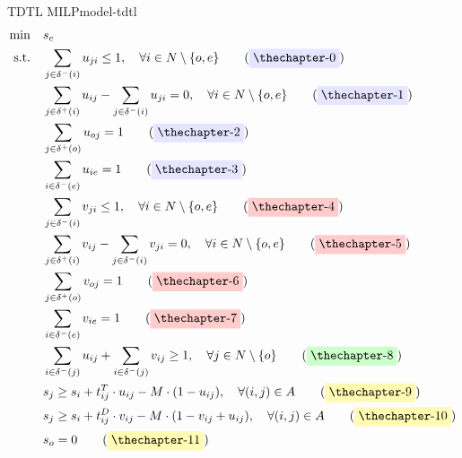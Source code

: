 {
\newcommand{\myYellowTag}[1]{\label{#1}\tag{\colorbox{shallow-yellow}{\theequation}}\addtocounter{equation}{1}}
\newcommand{\myRedTag}[1]{\label{#1}\tag{\colorbox{shallow-red}{\theequation}}\addtocounter{equation}{1}}
\newcommand{\myGreenTag}[1]{\label{#1}\tag{\colorbox{shallow-green}{\theequation}}\addtocounter{equation}{1}}
\newcommand{\myPurpleTag}[1]{\label{#1}\tag{\colorbox{shallow-purple}{\theequation}}\addtocounter{equation}{1}}
\newcommand{\myBlueTag}[1]{\label{#1}\tag{\colorbox{shallow-blue}{\theequation}}\addtocounter{equation}{1}}

\begin{model}{TDTL MILP}{model-tdtl}
\begin{align}
    \min \quad & s_{e} \label{eq:tdtl-obj}\\
    \text{s.t.} \quad & \sum_{j \in \delta^{-}(i)} u_{ji} \leq 1, \quad \forall i \in N \setminus \{o, e\} \myPurpleTag{eq:tdtl-truck-visit-limit}\\
    & \sum_{j \in \delta^{+}(i)} u_{ij} - \sum_{j \in \delta^{-}(i)} u_{ji} = 0, \quad \forall i \in N \setminus \{o, e\} \myPurpleTag{eq:tdtl-truck-flow-balance}\\
    & \sum_{j \in \delta^{+}(o)} u_{oj} = 1 \myPurpleTag{eq:tdtl-truck-start}\\
    & \sum_{i \in \delta^{-}(e)} u_{ie} = 1 \myPurpleTag{eq:tdtl-truck-end}\\
    & \sum_{j \in \delta^{-}(i)} v_{ji} \leq 1, \quad \forall i \in N \setminus \{o, e\} \myRedTag{eq:tdtl-drone-visit-limit}\\
    & \sum_{j \in \delta^{+}(i)} v_{ij} - \sum_{j \in \delta^{-}(i)} v_{ji} = 0, \quad \forall i \in N \setminus \{o, e\} \myRedTag{eq:tdtl-drone-flow-balance}\\
    & \sum_{j \in \delta^{+}(o)} v_{oj} = 1 \myRedTag{eq:tdtl-drone-start}\\
    & \sum_{i \in \delta^{-}(e)} v_{ie} = 1 \myRedTag{eq:tdtl-drone-end}\\
    & \sum_{i \in \delta^{-}(j)} u_{ij} + \sum_{i \in \delta^{-}(j)} v_{ij} \geq 1, \quad \forall j \in N \setminus \{o\} \myGreenTag{eq:tdtl-visit-either}\\
    & s_{j} \geq s_{i} + t_{ij}^{T} \cdot u_{ij} - M \cdot (1 - u_{ij}), \quad \forall (i, j) \in A \myYellowTag{eq:tdtl-truck-time}\\
    & s_{j} \geq s_{i} + t_{ij}^{D} \cdot v_{ij} - M \cdot (1 - v_{ij} + u_{ij}), \quad \forall (i, j) \in A \myYellowTag{eq:tdtl-drone-time}\\
    & s_{o} = 0 \myYellowTag{eq:tdtl-start-time}\\

\end{align}
\end{model}}
